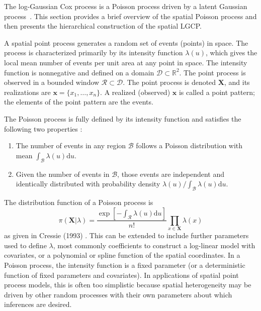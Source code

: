 \documentclass[]{interact}
\begin{document}
The log-Gaussian Cox process is a Poisson process driven by a latent Gaussian
process~\cite{moelleretal}. This section provides a brief overview of the
spatial Poisson process and then presents the hierarchical construction of the
spatial LGCP.

A spatial point process generates a random set of events (points) in space.
The process is characterized primarily by its intensity function
\(\lambda(u)\), which gives the local mean number of events per unit area at
any point in space. The intensity function is nonnegative and defined on a
domain \(\mathcal{D} \subset \mathbb{R}^{2}\). The point process is observed
in a bounded window \(\mathcal{R} \subset \mathcal{D}\). The point process is
denoted \(\mathbf{X}\), and its realizations are \(\mathbf{x} = \{x_{1},
\dots, x_{n}\}\). A realized (observed) \(\mathbf{x}\) is called a point
pattern; the elements of the point pattern are the events.

The Poisson process is fully defined by its intensity function and satisfies
the following two properties \cite{moellerwaagepetersen}:
\begin{enumerate}
\item The number of events in any region \(\mathcal{B}\) follows a Poisson
distribution with mean
\(\int_{\mathcal{B}} \lambda(u)\mathrm{d}u\).
\item Given the number of events in \(\mathcal{B}\), those events are
independent and identically distributed with probability density
\(\lambda(u) / \int_{\mathcal{B}} \lambda(u)\mathrm{d}u\).
\end{enumerate}
The distribution function of a Poisson process is
\begin{equation}
\pi(\mathbf{X}|\lambda)
= \frac{\exp\left[-\int_{\mathcal{R}} \lambda(u) \mathrm{d}u\right]}{n!}
\prod_{x \in \mathbf{X}} \lambda(x)
\end{equation}
as given in Cressie (1993) \cite{cressie}. This can be extended to include
further parameters used to define \(\lambda\), most commonly coefficients
to construct a log-linear model with covariates, or a polynomial or spline
function of the spatial coordinates. In a Poisson process, the intensity 
function is a fixed parameter (or a
deterministic function of fixed parameters and covariates). In applications of
spatial point process models, this is often too simplistic because spatial
heterogeneity may be driven by other random processes with their own parameters
about which inferences are desired.
\end{document}

